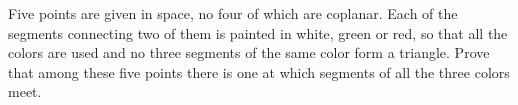 Five points are given in space, no four of which are coplanar. Each of the segments connecting two of them is painted in white, green or red, so that all the colors are used and no three segments of the same color form a triangle. Prove that among these five points there is one at which segments of all the three colors meet.